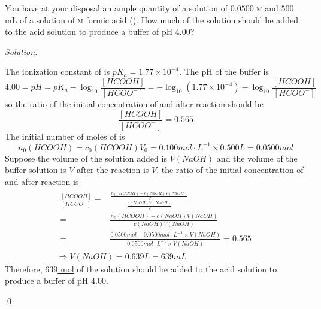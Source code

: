 \documentclass[12pt]{article}
\newenvironment{problem}[2][Problem]{\begin{trivlist}
\item[\hskip \labelsep {\bfseries #1}\hskip \labelsep {\bfseries #2.}]}{\end{trivlist}}
\newenvironment{sol}
    {\emph{Solution:}
    }
    {
    \qed
    }
\begin{document}
\begin{problem}{15.49}
You have at your disposal an ample quantity of a solution of $0.0500$ \textsc{m}  and $500$ mL of a solution of  \textsc{m} formic acid (). How much of the  solution should be added to the acid solution to produce a buffer of pH $4.00$?
\end{problem}
\begin{sol}
The ionization constant of  is $pK_a=1.77\times10^{-4}$. The pH of the buffer is
\[
4.00=pH=pK_a-\log_{10}\frac{[HCOOH]}{[HCOO^-]}=-\log_{10}(1.77\times10^{-4})-\log_{10}\frac{[HCOOH]}{[HCOO^-]}
\]
so the ratio of the initial concentration of  and  after reaction should be
\[
\frac{[HCOOH]}{[HCOO^-]}=0.565
\]
The initial number of moles of  is
\[
n_0(HCOOH)=c_0(HCOOH)V_0=0.100mol\cdot L^{-1}\times0.500L=0.0500mol
\]
Suppose the volume of the  solution added is $V(NaOH)$ and the volume of the buffer solution is $V$ after the reaction is $V$, the ratio of the initial concentration of  and  after reaction is
\begin{gather*}
\begin{align*}
\frac{[HCOOH]}{[HCOO^-]}=&\frac{\frac{n_0(HCOOH)-c(NaOH)V(NaOH)}{V}}{\frac{c(NaOH)V(NaOH)}{V}}\\
=&\frac{n_0(HCOOH)-c(NaOH)V(NaOH)}{c(NaOH)V(NaOH)}\\
=&\frac{0.0500mol-0.0500mol\cdot L^{-1}\times V(NaOH)}{0.0500mol\cdot L^{-1}\times V(NaOH)}=0.565
\end{align*}\\
\Longrightarrow V(NaOH)=0.639L=639mL
\end{gather*}
Therefore, \uline{$639$ mol} of the  solution should be added to the acid solution to produce a buffer of pH $4.00$.
\end{sol}
\end{document}
